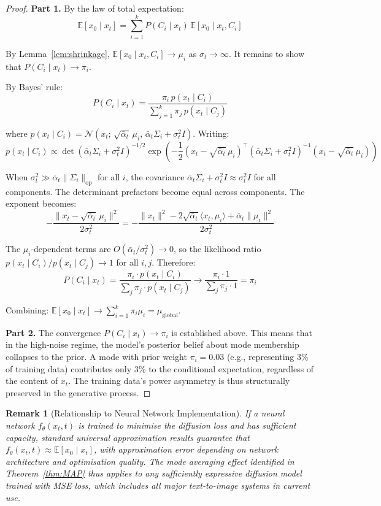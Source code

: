 \documentclass[11pt]{article}
\newtheorem{remark}[theorem]{Remark}
\begin{document}
\begin{proof}
\textbf{Part 1.} By the law of total expectation:
$$\mathbb{E}[x_0 \mid x_t] = \sum_{i=1}^k P(C_i \mid x_t)\, \mathbb{E}[x_0 \mid x_t, C_i]$$

By Lemma~\ref{lem:shrinkage}, $\mathbb{E}[x_0 \mid x_t, C_i] \to \mu_i$ as $\sigma_t \to \infty$. It remains to show that $P(C_i \mid x_t) \to \pi_i$.

By Bayes' rule:
$$P(C_i \mid x_t) = \frac{\pi_i\, p(x_t \mid C_i)}{\sum_{j=1}^k \pi_j\, p(x_t \mid C_j)}$$

where $p(x_t \mid C_i) = \mathcal{N}(x_t;\, \sqrt{\bar{\alpha}_t}\, \mu_i,\, \bar{\alpha}_t \Sigma_i + \sigma_t^2 I)$. Writing:
$$p(x_t \mid C_i) \propto \det(\bar{\alpha}_t \Sigma_i + \sigma_t^2 I)^{-1/2} \exp\!\left(-\frac{1}{2}(x_t - \sqrt{\bar{\alpha}_t}\, \mu_i)^\top (\bar{\alpha}_t \Sigma_i + \sigma_t^2 I)^{-1} (x_t - \sqrt{\bar{\alpha}_t}\, \mu_i)\right)$$

When $\sigma_t^2 \gg \bar{\alpha}_t \|\Sigma_i\|_{\mathrm{op}}$ for all $i$, the covariance $\bar{\alpha}_t \Sigma_i + \sigma_t^2 I \approx \sigma_t^2 I$ for all components. The determinant prefactors become equal across components. The exponent becomes:
$$-\frac{\|x_t - \sqrt{\bar{\alpha}_t}\, \mu_i\|^2}{2\sigma_t^2} = -\frac{\|x_t\|^2 - 2\sqrt{\bar{\alpha}_t}\langle x_t, \mu_i\rangle + \bar{\alpha}_t \|\mu_i\|^2}{2\sigma_t^2}$$

The $\mu_i$-dependent terms are $O(\bar{\alpha}_t / \sigma_t^2) \to 0$, so the likelihood ratio $p(x_t \mid C_i) / p(x_t \mid C_j) \to 1$ for all $i, j$. Therefore:
$$P(C_i \mid x_t) = \frac{\pi_i \cdot p(x_t \mid C_i)}{\sum_j \pi_j \cdot p(x_t \mid C_j)} \to \frac{\pi_i \cdot 1}{\sum_j \pi_j \cdot 1} = \pi_i$$

Combining: $\mathbb{E}[x_0 \mid x_t] \to \sum_{i=1}^k \pi_i \mu_i = \mu_{\mathrm{global}}$.

\textbf{Part 2.} The convergence $P(C_i \mid x_t) \to \pi_i$ is established above. This means that in the high-noise regime, the model's posterior belief about mode membership collapses to the prior. A mode with prior weight $\pi_i = 0.03$ (e.g., representing 3\% of training data) contributes only 3\% to the conditional expectation, regardless of the content of $x_t$. The training data's power asymmetry is thus structurally preserved in the generative process.
\end{proof}

\begin{remark}[Relationship to Neural Network Implementation]\label{rem:nn}
If a neural network $f_\theta(x_t, t)$ is trained to minimise the diffusion loss and has sufficient capacity, standard universal approximation results guarantee that $f_\theta(x_t, t) \approx \mathbb{E}[x_0 \mid x_t]$, with approximation error depending on network architecture and optimisation quality. The mode averaging effect identified in Theorem~\ref{thm:MAP} thus applies to any sufficiently expressive diffusion model trained with MSE loss, which includes all major text-to-image systems in current use.
\end{remark}
\end{document}
